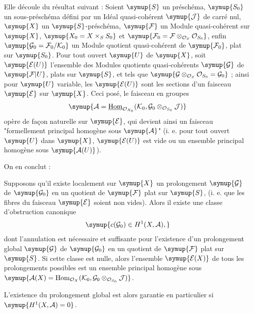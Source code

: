 Elle découle du résultat suivant :
 Soient $\symup{S}$ un préschéma, $\symup{S_0}$ un sous-préschéma
défini par un Idéal quasi-cohérent $\symup{\mathcal J}$ de carré nul, $\symup{X}$ un
$\symup{S}$-préschéma, $\symup{\mathcal F}$ un Module quasi-cohérent sur $\symup{X}$,
$\symup{X_0=X\times_SS_0}$ et
$\symup{\mathcal F_0=\mathcal F\otimes_{\mathcal O_S}\mathcal O_{S_0}}$, enfin
$\symup{\mathcal G_0=\mathcal F_0/\mathcal K_0}$ un Module quotient quasi-cohérent de
$\symup{\mathcal F_0}$, plat sur $\symup{S_0}$. Pour tout ouvert $\symup{U}$ de $\symup{X}$, soit
$\symup{\mathcal E(U)}$ l'ensemble des Modules quotients quasi-cohérents $\symup{\mathcal G}$ de
$\symup{\mathcal F|U}$, plats sur $\symup{S}$, et tels que
$\symup{\mathcal G\otimes_{\mathcal O_S}\mathcal O_{S_0}=\mathcal G_0}$ ; ainsi pour
$\symup{U}$ variable, les $\symup{\mathcal E(U)}$ sont les sections d'un faisceau $\symup{\mathcal E}$
sur $\symup{X}$. Ceci posé, le faisceau en groupes
\[
\symup{\mathcal A=\underline{\operatorname{Hom}}_{\mathcal O_{X_0}}
(\mathcal K_0,\mathcal G_0\otimes_{\mathcal O_{S_0}}\mathcal J)}
\]
opère de façon naturelle sur $\symup{\mathcal E}$, qui devient ainsi un faisceau
"formellement principal homogène sous $\symup{\mathcal A}$" (i. e. pour tout ouvert
$\symup{U}$ dans $\symup{X}$, $\symup{\mathcal E(U)}$ est vide ou un ensemble principal homogène sous
$\symup{\mathcal A(U)}$).

On en conclut :

 Supposons qu'il existe localement sur $\symup{X}$ un
prolongement $\symup{\mathcal G}$ de $\symup{\mathcal G_0}$ en un quotient de $\symup{\mathcal F}$ plat
sur $\symup{S}$, (i. e. que les fibres du faisceau $\symup{\mathcal E}$ soient non vides). Alors
il existe une classe d'obstruction canonique
\[
\symup{c(\mathcal G_0)\in H^1(X,\mathcal A),}
\]
dont l'annulation est nécessaire et suffisante pour l'existence d'un
prolongement global $\symup{\mathcal G}$ de $\symup{\mathcal G_0}$ en un quotient de
$\symup{\mathcal F}$ plat sur $\symup{S}$. Si cette classe est nulle, alors l'ensemble
$\symup{\mathcal E(X)}$ de tous les prolongements possibles est un ensemble principal
homogène sous $\symup{\mathcal A(X)=\operatorname{Hom}_{\mathcal O_X}(\mathcal K_0,\mathcal G_0\otimes_{\mathcal O_{S_0}}\mathcal J)}$.

L'existence du prolongement global est alors garantie en particulier si
$\symup{H^1(X,\mathcal A)=0}$.

